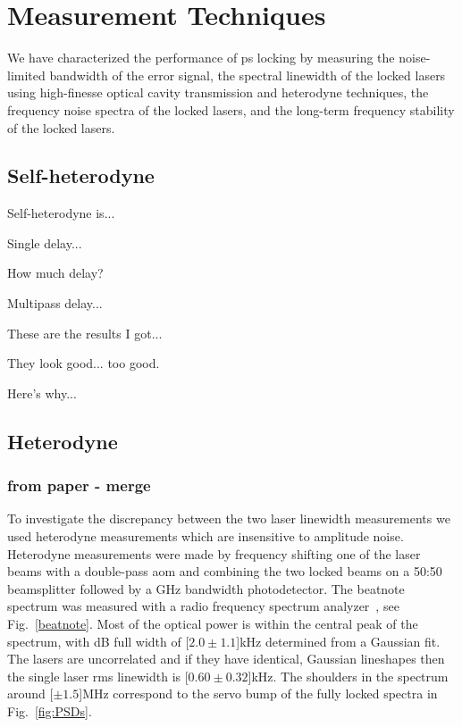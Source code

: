 \section{Measurement Techniques}
We have characterized the performance of \gls*{ps} locking by measuring the noise-limited bandwidth of the error signal, the spectral linewidth of the locked lasers using high-finesse optical cavity transmission and heterodyne techniques, the frequency noise spectra of the locked lasers, and the long-term frequency stability of the locked lasers.

\subsection{Self-heterodyne}

Self-heterodyne is...

Single delay...

How much delay?

Multipass delay...

These are the results I got...

They look good... too good.

Here's why...\cite{richter_linewidth_1986}

\subsection{Heterodyne}
\subsubsection{from paper - merge}
To investigate the discrepancy between the two laser linewidth measurements we used heterodyne measurements which are insensitive to amplitude noise.
Heterodyne measurements were made by frequency shifting one of the laser beams with a double-pass \gls*{aom} and combining the two locked beams on a 50:50 beamsplitter followed by a \unit[1]{GHz} bandwidth photodetector.
The beatnote spectrum was measured with a radio frequency spectrum analyzer~\cite{equipment}, see Fig.~\ref{beatnote}.
Most of the optical power is within the central peak of the spectrum, with \unit[-3]{dB} full width of \unit[$2.0\pm1.1$]{kHz} determined from a Gaussian fit.
The lasers are uncorrelated and if they have identical, Gaussian lineshapes then the single laser \gls*{rms} linewidth is \unit[$0.60\pm0.32$]{kHz}.
The shoulders in the spectrum around \unit[$\pm1.5$]{MHz} correspond to the servo bump of the fully locked spectra in Fig.~\ref{fig:PSDs}.

